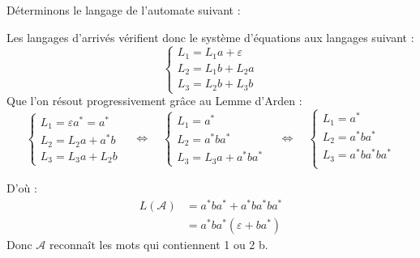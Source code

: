 \begin{example}

    Déterminons le langage de l'automate suivant :

    \begin{center}
    \end{center}

    Les langages d'arrivés vérifient donc le système d'équations aux langages suivant :
    \[ 
        \begin{cases}
            L_1 = L_1 a + \varepsilon \\ 
            L_2 = L_1 b + L_2 a \\ 
            L_3 = L_2 b + L_3 b 
        \end{cases}
    \] 
    Que l'on résout progressivement grâce au Lemme d'Arden : 
    \[ 
        \begin{cases}
            L_1 = \varepsilon a^* = a^* \\ 
            L_2 = L_2 a + a^* b \\ 
            L_3 = L_3 a + L_2 b 
        \end{cases}
        \quad \iff \quad 
        \begin{cases}
            L_1 = a^* \\ 
            L_2 = a^*ba^* \\ 
            L_3 = L_3a + a^*ba^* 
        \end{cases} 
    \quad \iff \quad 
        \begin{cases}
            L_1 = a^* \\ 
            L_2 = a^*ba^* \\ 
            L_3 = a^*ba^* b a^* \\ 
        \end{cases}
    \]

    D'où : 
        \begin{align*}
            L( \mathcal{A}) &= a^*ba^* + a^*ba^* b a^* \\ 
            &= a^*ba^*(\varepsilon + ba^*) 
        \end{align*}
    Donc $ \mathcal{A}$ reconnaît les mots qui contiennent 1 ou 2 b. 
\end{example}

